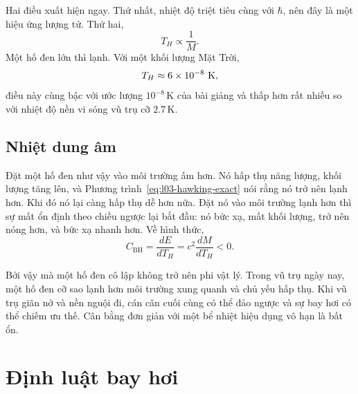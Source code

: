Hai điều xuất hiện ngay. Thứ nhất, nhiệt độ triệt tiêu cùng với \(\hbar\), nên đây là một hiệu ứng lượng tử. Thứ hai,
\begin{equation}
T_H\propto\frac{1}{M}.
\end{equation}
Một hố đen lớn thì lạnh. Với một khối lượng Mặt Trời,
\begin{equation}
T_H\approx6\times10^{-8}\ {\rm K},
\end{equation}
điều này cùng bậc với ước lượng \(10^{-8}\,\mathrm{K}\) của bài giảng và thấp hơn rất nhiều so với nhiệt độ nền vi sóng vũ trụ cỡ \(2.7\,\mathrm{K}\).

\subsection{Nhiệt dung âm}

Đặt một hố đen như vậy vào môi trường ấm hơn. Nó hấp thụ năng lượng, khối lượng tăng lên, và Phương trình~\eqref{eq:l03-hawking-exact} nói rằng nó trở nên lạnh hơn. Khi đó nó lại càng hấp thụ dễ hơn nữa. Đặt nó vào môi trường lạnh hơn thì sự mất ổn định theo chiều ngược lại bắt đầu: nó bức xạ, mất khối lượng, trở nên nóng hơn, và bức xạ nhanh hơn. Về hình thức,
\begin{equation}
C_{\mathrm{BH}}
=\frac{dE}{dT_H}
=c^2\frac{dM}{dT_H}
<0.
\end{equation}

\begin{classroomqa}
\end{classroomqa}

Bởi vậy mà một hố đen cô lập không trở nên phi vật lý. Trong vũ trụ ngày nay, một hố đen cỡ sao lạnh hơn môi trường xung quanh và chủ yếu hấp thụ. Khi vũ trụ giãn nở và nền nguội đi, cán cân cuối cùng có thể đảo ngược và sự bay hơi có thể chiếm ưu thế. Cân bằng đơn giản với một bể nhiệt hiệu dụng vô hạn là bất ổn.

\section{Định luật bay hơi}

